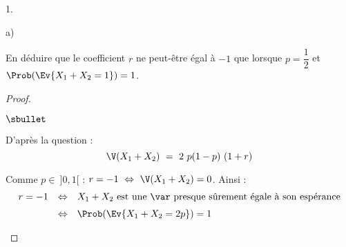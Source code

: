 \documentclass[11pt]{article}%
\begin{document}
\begin{noliste}{1.}
\begin{noliste}{a)}
  \item En déduire que le coefficient $r$ ne peut-être égal à $-1$ que
    lorsque $p = \dfrac{1}{2}$ et $\Prob(\Ev{X_1 + X_2 = 1}) = 1$.

    \begin{proof}~%
      \begin{noliste}{$\sbullet$}
      \item D'après la question  :
        \[
        \V(X_1 + X_2) \ = \ 2 \ p(1-p) \ (1 + r)
        \]
      \item Comme $p \in \ ]0,1[$ : $r = -1 \ \Leftrightarrow \ \V(X_1
        + X_2) = 0$. Ainsi :
        \[
        \begin{array}{rcl}
          r = -1 & \Leftrightarrow & \text{$X_1 + X_2$ est une \var
            presque sûrement égale à son espérance}
          \\[.2cm]
          & \Leftrightarrow & \Prob(\Ev{X_1 + X_2 = 2p}) = 1
        \end{array}
        \]


        \newpage



\end{noliste}
\end{proof}
\end{noliste}
\end{noliste}
\end{document}
